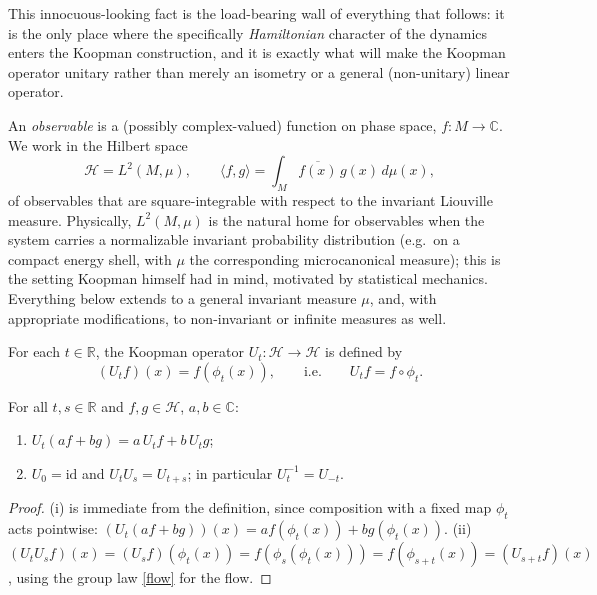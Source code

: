 This innocuous-looking fact is the load-bearing wall of everything that
follows: it is the only place where the specifically \emph{Hamiltonian}
character of the dynamics enters the Koopman construction, and it is exactly
what will make the Koopman operator unitary rather than merely an isometry or a
general (non-unitary) linear operator.

An \emph{observable} is a (possibly complex-valued) function on phase space, 
$f:M\to\mathbb C$. We work in the Hilbert space
\begin{equation}
\mathcal H = L^2(M,\mu), \qquad \langle f,g\rangle = 
    \int_M \overline{f(x)}\,g(x)\,d\mu(x),
\end{equation}
of observables that are square-integrable with respect to the invariant
Liouville measure. Physically, $L^2(M,\mu)$ is the natural home for observables
when the system carries a normalizable invariant probability distribution
(e.g.\ on a compact energy shell, with $\mu$ the corresponding microcanonical
measure); this is the setting Koopman himself had in mind, motivated by
statistical mechanics. Everything below extends to a general invariant measure
$\mu$, and, with appropriate modifications, to non-invariant or infinite
measures as well.

\begin{definition}
For each $t\in\mathbb R$, the Koopman operator $U_t:\mathcal H\to\mathcal H$ 
    is defined by
\begin{equation}
(U_t f)(x) = f(\phi_t(x)), \qquad\text{i.e.}\qquad U_t f = f\circ\phi_t.
\end{equation}
\end{definition}

\begin{proposition}
\label{linear-group}
For all $t,s\in\mathbb R$ and $f,g\in\mathcal H$, $a,b\in\mathbb C$:
\begin{enumerate}
\item $U_t(af+bg) = a\,U_tf+b\,U_tg$;
\item $U_0=\mathrm{id}$ and $U_tU_s=U_{t+s}$; in particular 
    $U_t^{-1}=U_{-t}$.
\end{enumerate}
\end{proposition}
\begin{proof}
(i) is immediate from the definition, since composition with a fixed map 
    $\phi_t$ acts pointwise: $(U_t(af+bg))(x) = af(\phi_t(x))+bg(\phi_t(x))$.
(ii) $(U_tU_sf)(x) = (U_sf)(\phi_t(x)) = f(\phi_s(\phi_t(x))) = f(\phi_{s+t}(x)) 
    = (U_{s+t}f)(x)$, using the group law \eqref{flow} for the flow.
\end{proof}

